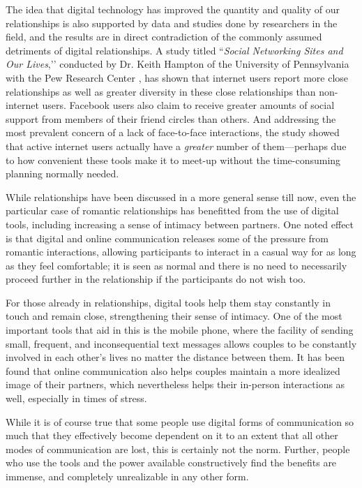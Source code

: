 \documentclass[11pt,a4paper]{article}
\begin{document}
The idea that digital technology has improved the quantity and quality of our relationships is also supported by data and studies done by researchers in the field, and the results are in direct contradiction of the commonly assumed detriments of digital relationships. A study titled ``\emph{Social Networking Sites and Our Lives},’’ conducted by Dr. Keith Hampton of the University of Pennsylvania with the Pew Research Center \cite{prc}, has shown that internet users report more close relationships as well as greater diversity in these close relationships than non-internet users. Facebook users also claim to receive greater amounts of social support from members of their friend circles than others. And addressing the most prevalent concern of a lack of face-to-face interactions, the study showed that active internet users actually have a \emph{greater} number of them---perhaps due to how convenient these tools make it to meet-up without the time-consuming planning normally needed.

While relationships have been discussed in a more general sense till now, even the particular case of romantic relationships has benefitted from the use of digital tools, including increasing a sense of intimacy between partners. One noted effect is that digital and online communication releases some of the pressure from romantic interactions, allowing participants to interact in a casual way for as long as they feel comfortable; it is seen as normal and there is no need to necessarily proceed further in the relationship if the participants do not wish too.

For those already in relationships, digital tools help them stay constantly in touch and remain close, strengthening their sense of intimacy. One of the most important tools that aid in this is the mobile phone, where the facility of sending small, frequent, and inconsequential text messages allows couples to be constantly involved in each other’s lives no matter the distance between them. It has been found that online communication also helps couples maintain a more idealized image of their partners, which nevertheless helps their in-person interactions as well, especially in times of stress.

While it is of course true that some people use digital forms of communication so much that they effectively become dependent on it to an extent that all other modes of communication are lost, this is certainly not the norm. Further, people who use the tools and the power available constructively find the benefits are immense, and completely unrealizable in any other form.
\end{document}
